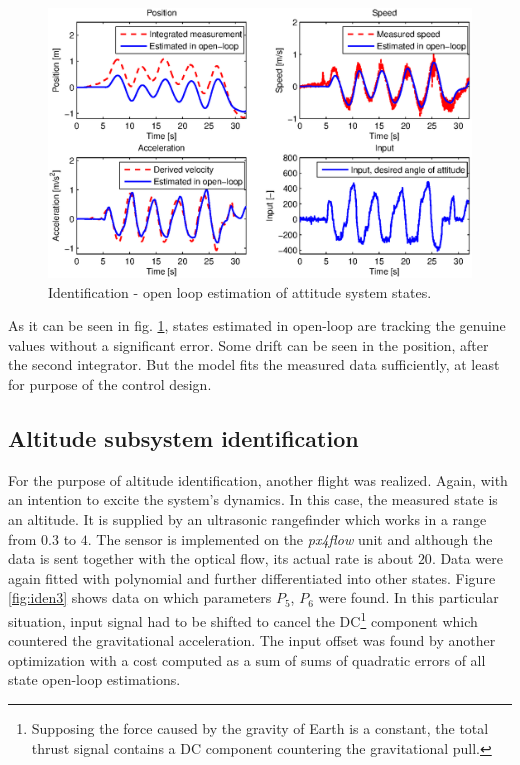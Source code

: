 \begin{figure}[h]
\includegraphics[width=1\textwidth]{fig/iden2.eps} 
\caption{Identification - open loop estimation of attitude system states.}
\label{fig:iden2}
\end{figure}

As it can be seen in fig. \ref{fig:iden2}, states estimated in open-loop are tracking the genuine values without a significant error. Some drift can be seen in the position, after the second integrator. But the model fits the measured data sufficiently, at least for purpose of the control design. 

\subsection{Altitude subsystem identification}

For the purpose of altitude identification, another flight was realized. Again, with an intention to excite the system's dynamics. In this case, the measured state is an altitude. It is supplied by an ultrasonic rangefinder which works in a range from $0.3$ to $4$. The sensor is implemented on the \emph{px4flow} unit and although the data is sent together with the optical flow, its actual rate is about $20$. Data were again fitted with polynomial and further differentiated into other states. Figure \ref{fig:iden3} shows data on which parameters $P_5$, $P_6$ were found. In this particular situation, input signal had to be shifted to cancel the DC\footnote{Supposing the force caused by the gravity of Earth is a constant, the total thrust signal contains a DC component countering the gravitational pull.} component which countered the gravitational acceleration. The input offset was found by another optimization with a cost computed as a sum of sums of quadratic errors of all state open-loop estimations.

